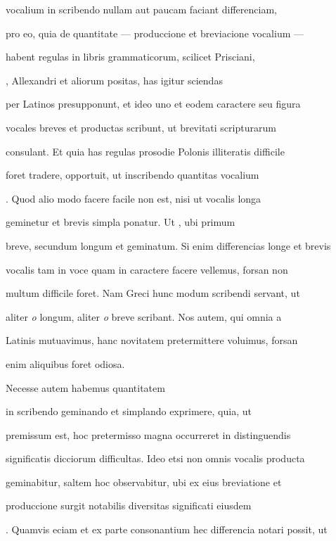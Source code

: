 \renewcommand{\theFancyVerbLine}{06-\arabic{FancyVerbLine}\phantom{a}}
%
\begin{VerbatimLatin}[firstnumber=16]
 vocalium in scribendo nullam aut paucam faciant differenciam,

pro eo, quia de quantitate — produccione et breviacione vocalium — 

 habent regulas in libris grammaticorum, scilicet Prisciani,

, Allexandri et aliorum positas, has igitur sciendas

per Latinos presupponunt, et ideo uno et eodem caractere seu figura

vocales breves et productas scribunt, ut brevitati scripturarum

consulant. Et quia has regulas prosodie Polonis illiteratis difficile

foret tradere, opportuit, ut inscribendo quantitas vocalium 

. Quod alio modo facere facile non est, nisi ut vocalis longa

geminetur et brevis simpla ponatur. Ut , ubi primum 

breve, secundum longum et geminatum. Si enim differencias longe et brevis

vocalis tam in voce quam in caractere facere vellemus, forsan non

multum difficile foret. Nam Greci hunc modum scribendi servant, ut

aliter \textit{o} longum, aliter \textit{o} breve scribant. Nos autem, qui omnia a

Latinis mutuavimus, hanc novitatem pretermittere voluimus, forsan
\end{VerbatimLatin}
\renewcommand{\theFancyVerbLine}{\textcolor{green}{06-31\alph{FancyVerbLine}}}
\begin{VerbatimLatin}[firstnumber=1]
enim aliquibus foret odiosa.

\indentK Necesse autem habemus quantitatem 
\end{VerbatimLatin}
\renewcommand{\theFancyVerbLine}{06-\arabic{FancyVerbLine}\phantom{a}}
%
\begin{VerbatimLatin}[firstnumber=32]
 in scribendo geminando et simplando exprimere, quia, ut

premissum est, hoc pretermisso magna occurreret in distinguendis

significatis dicciorum difficultas. Ideo etsi non omnis vocalis producta

geminabitur, saltem hoc observabitur, ubi ex eius breviatione et

produccione surgit notabilis diversitas significati eiusdem 

. Quamvis eciam et ex parte consonantium hec differencia notari possit, ut
\end{VerbatimLatin}
